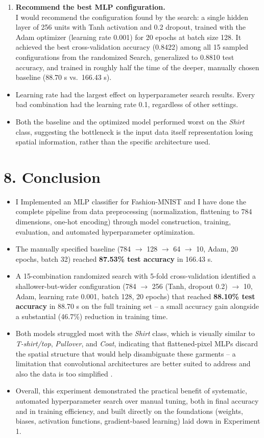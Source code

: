\documentclass[11pt]{article}
\begin{document}
\begin{enumerate}
\item \textbf{Recommend the best MLP configuration.}\\
I would recommend the configuration found by the search: a single hidden layer of 256 units with
Tanh activation and 0.2 dropout, trained with the Adam optimizer (learning rate 0.001) for 20
epochs at batch size 128. It achieved the best cross-validation accuracy (0.8422) among all 15 sampled 
configurations from the randomized Search, generalized to 0.8810 test accuracy, and trained in roughly half the time of the
deeper, manually chosen baseline (88.70 s vs.\ 166.43 s).
\end{enumerate}

\begin{itemize}
\item Learning rate had the largest effect on hyperparameter search results. Every bad combination had the  learning rate 0.1, regardless of other settings.
\item Both the baseline and the optimized model performed worst on the \emph{Shirt} class,
suggesting the bottleneck is the input data itself 
representation losing spatial information,
rather than the specific architecture used.
\end{itemize}

\section*{8. Conclusion}
\begin{itemize}
\item I Implemented an MLP classifier for Fashion-MNIST and I have done  the complete pipeline from data
preprocessing (normalization, flattening to 784 dimensions, one-hot encoding) through model
construction, training, evaluation, and automated hyperparameter optimization.
\item The manually specified baseline (784 $\to$ 128 $\to$ 64 $\to$ 10, Adam, 20 epochs, batch 32)
reached \textbf{87.53\% test accuracy} in 166.43 s.
\item A 15-combination randomized search with 5-fold cross-validation identified a
shallower-but-wider configuration (784 $\to$ 256 (Tanh, dropout 0.2) $\to$ 10, Adam, learning rate
0.001, batch 128, 20 epochs) that reached \textbf{88.10\% test accuracy} in 88.70 s on the full
training set -- a small accuracy gain alongside a substantial (46.7\%) reduction in training time.
\item Both models struggled most with the \emph{Shirt} class, which is visually similar to
\emph{T-shirt/top}, \emph{Pullover}, and \emph{Coat}, indicating that flattened-pixel MLPs discard
the spatial structure that would help disambiguate these garments -- a limitation that
convolutional architectures are better suited to address and also the data is too simplified .
\item Overall, this experiment demonstrated the practical benefit of systematic, automated
hyperparameter search over manual tuning, both in final accuracy and in training efficiency, and
built directly on the foundations (weights, biases, activation functions, gradient-based learning)
laid down in Experiment 1.
\end{itemize}
\end{document}
